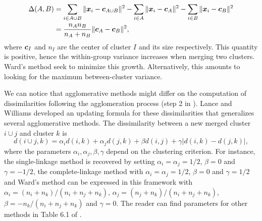 \begin{align*}
  \Delta(A,B) &= \sum_{i\in A\cup B} \|\boldsymbol x_i - \boldsymbol c_{A \cup B} \|^2-\sum_{i\in A} \|\boldsymbol x_i - \boldsymbol c_{A} \|^2-\sum_{i\in B} \|\boldsymbol x_i - \boldsymbol c_{B} \|^2\\
  &= \frac{n_An_B}{n_A+ n_B}\|\boldsymbol c_A - \boldsymbol c_B \|^2,
\end{align*}
where $\boldsymbol c_I$ and $n_I$ are the center of cluster $I$ and its size respectively.  This quantity is positive, hence the within-group variance increases when merging two clusters. Ward's method seek to minimize this growth. Alternatively, this amounts to looking for the maximum between-cluster variance. 

We can notice that agglomerative methods might differ on the computation of dissimilarities following the agglomeration process (step 2 in ). Lance and Williams developed an updating formula \citep{lance_williams_67} for these dissimilarities that generalizes several agglomerative methods. The dissimilarity between a new merged cluster $i \cup j$ and cluster $k$ is
\begin{equation}
  d(i \cup j,k) = \alpha_i d(i,k)+\alpha_jd(j,k)+\beta d(i, j) +\gamma |d(i,k)-d(j,k)|,
\end{equation}
where the parameters $\alpha_i , \alpha_j, \beta, \gamma$ depend on the clustering criterion. For instance, the single-linkage method is recovered by setting $\alpha_i =\alpha_j = 1/2$, $\beta =0$ and $\gamma =-1/2$, the complete-linkage method with $\alpha_i =\alpha_j = 1/2$, $\beta =0$ and $\gamma =1/2$ and Ward's method can be expressed in this framework \citep{Batagelj88generalizedward,f.1985multidimensional,jambu1989exploration} with $\alpha_i=(n_i+n_k)/(n_i+n_j+n_k)$, $\alpha_j=(n_j+n_k)/(n_i+n_j+n_k)$, $\beta=-n_k/(n_i+n_j+n_k)$ and $\gamma=0$. The reader can find parameters for other methods in Table 6.1 of \citep{hennig2015handbook}.
